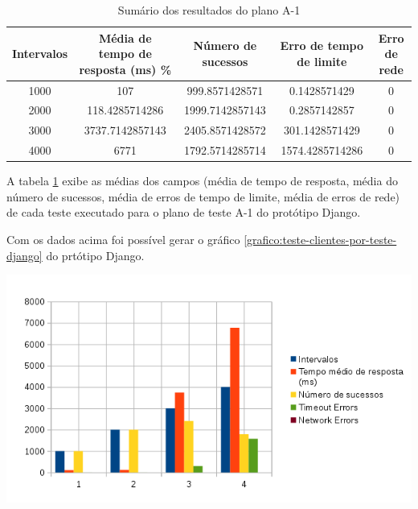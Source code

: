    
  \begin{table}[H]
    \centering
    \footnotesize
    \setlength{\abovecaptionskip}{0pt}
    \setlength{\belowcaptionskip}{0pt}
    \caption[Sumário dos resultados do plano A-1]{Sumário dos resultados do plano A-1	}
    \label{tab:sumario-resultado-plano-teste-a-1}
    \begin{tabular}{c|c|c|c|c}
      \hline \hline
      Intervalos  & 	Média de tempo de resposta (ms) \% &	Número de sucessos & 	Erro de tempo de limite &	Erro de rede \\ 
      \hline \hline
      1000 &		107 &					999.8571428571 & 		0.1428571429 &			0 \\
      2000 &		118.4285714286 &			1999.7142857143 & 		0.2857142857  &			0 \\
      3000 &		3737.7142857143 &			2405.8571428572 & 		301.1428571429 &		0 \\
      4000 &		6771 &					1792.5714285714 & 		1574.4285714286 &		0 \\
      \hline \hline
    \end{tabular}
  \end{table}
  
  A tabela \ref{tab:sumario-resultado-plano-teste-a-1} exibe as médias dos campos (média de tempo de resposta, 
  média do número de sucessos, média de erros de tempo de limite, média de erros de rede) de cada teste executado 
  para o plano de teste A-1 do protótipo Django.
  
  Com os dados acima foi possível gerar o gráfico \ref{grafico:teste-clientes-por-teste-django} do 
  prtótipo Django.
  
  \begin{grafico}[H]
    \setlength{\abovecaptionskip}{5pt}
    \setlength{\belowcaptionskip}{0pt}
    \label{grafico:teste-clientes-por-teste-django}
    \caption[Clientes por teste no Django]
	    {Clientes por teste no Django}
    \centering
    \includegraphics[width=.80\textwidth]{imagem/graficos/grafico_django_plano_de_teste_1.png}
    \captionsetup[grafico]{justification=centering}
  \end{grafico}
  
